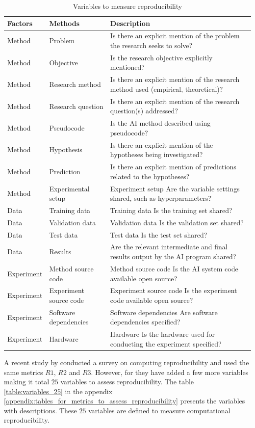 \documentclass[
10pt, %
a4paper, %
oneside, %
headinclude,footinclude, %
BCOR5mm, %
]{scrartcl}
\begin{document}
\begin{table}[H]
\caption{Variables to measure reproducibility}
\centering
\label{table:variables_16}
\begin{tabular}[t]{|p{2cm}|p{2cm}|p{9cm}|}
\hline
Factors & Methods & Description \\
\hline
Method & Problem & Is there an explicit mention of the problem the research seeks to solve? \\
Method & Objective & Is the research objective explicitly mentioned? \\
Method &  Research method & Is there an explicit mention of the research method used (empirical, theoretical)? \\
Method &  Research question& Is there an explicit mention of the research question(s) addressed? \\
 Method & Pseudocode &  Is the AI method described using pseudocode?  \\
Method & Hypothesis & Is there an explicit mention of the hypotheses being investigated? \\
Method & Prediction &  Is there an explicit mention of predictions related to the hypotheses? \\
Method & Experimental setup & Experiment setup Are the variable settings shared, such as hyperparameters? \\
Data & Training data & Training data Is the training set shared? \\
Data & Validation data & Validation data Is the validation set shared? \\
Data & Test data & Test data Is the test set shared? \\
Data & Results & Are the relevant intermediate and final results output by the AI program shared? \\
Experiment & Method source code & Method source code Is the AI system code available open source? \\
Experiment & Experiment source code & Experiment source code Is the experiment code available open source? \\
Experiment & Software dependencies & Software dependencies Are software dependencies specified? \\
Experiment & Hardware & Hardware Is the hardware used for conducting the experiment specified?\\ \hline
\end{tabular}
\end{table}

A recent study by \cite{Raghupathi2022} conducted a survey on computing reproducibility and used the same metrics $R1$, $R2$ and $R3$. However, for they have added a few more variables making it total $25$ variables to assess reproducibility. The table \ref{table:variables_25} in the appendix \ref{appendix:tables_for_metrics_to_assess_reproducibility} presents the variables with descriptions. These $25$ variables are defined to measure computational reproducibility. 
\end{document}
